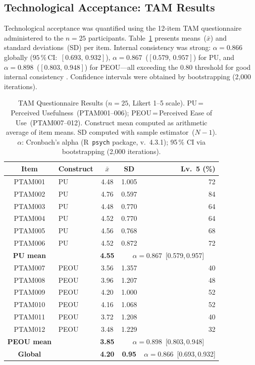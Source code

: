 \documentclass[journal]{IEEEtran}
\begin{document}
	\subsection{Technological Acceptance: TAM Results}
	Technological acceptance was quantified using the 12-item TAM
	questionnaire administered to the $n{=}25$ participants.
	Table~\ref{tab:tam} presents means~($\bar{x}$) and standard
	deviations~(SD) per item.
	Internal consistency was strong: $\alpha{=}0.866$ globally
	($95\,\%$\,CI:~$[0.693,\,0.932]$),
	$\alpha{=}0.867$~($[0.579,\,0.957]$) for PU, and
	$\alpha{=}0.898$~($[0.803,\,0.948]$) for PEOU---all exceeding
	the 0.80 threshold for good internal consistency
	\cite{nunnally1978}.
	Confidence intervals were obtained by bootstrapping
	(2{,}000 iterations).
	
	\begin{table}[!t]
		\caption{TAM Questionnaire Results ($n{=}25$, Likert 1--5 scale).
			PU\,=\,Perceived Usefulness~(PTAM001--006);
			PEOU\,=\,Perceived Ease of Use~(PTAM007--012).
			Construct mean computed as arithmetic average of item means.
			SD computed with sample estimator~($N-1$).
			$\alpha$: Cronbach's alpha (R~\texttt{psych} package, v.~4.3.1);
			95\,\% CI via bootstrapping (2{,}000 iterations).}
		\label{tab:tam}
		\centering
		\small
		\renewcommand{\arraystretch}{1.25}
		\begin{tabular}{clccr}
			\toprule
			\textbf{Item} & \textbf{Construct} & \textbf{$\bar{x}$} & \textbf{SD} & \textbf{Lv.~5 (\%)} \\
			\midrule
			PTAM001 & PU  & 4.48 & 1.005 & 72 \\
			PTAM002 & PU  & 4.76 & 0.597 & 84 \\
			PTAM003 & PU  & 4.48 & 0.770 & 64 \\
			PTAM004 & PU  & 4.52 & 0.770 & 64 \\
			PTAM005 & PU  & 4.56 & 0.768 & 68 \\
			PTAM006 & PU  & 4.52 & 0.872 & 72 \\
			\midrule
			\textbf{PU mean} & & \textbf{4.55} & \multicolumn{2}{c}{$\alpha{=}0.867$~[0.579,\,0.957]} \\
			\midrule
			PTAM007 & PEOU & 3.56 & 1.357 & 40 \\
			PTAM008 & PEOU & 3.96 & 1.207 & 48 \\
			PTAM009 & PEOU & 4.20 & 1.000 & 52 \\
			PTAM010 & PEOU & 4.16 & 1.068 & 52 \\
			PTAM011 & PEOU & 3.72 & 1.208 & 40 \\
			PTAM012 & PEOU & 3.48 & 1.229 & 32 \\
			\midrule
			\textbf{PEOU mean} & & \textbf{3.85} & \multicolumn{2}{c}{$\alpha{=}0.898$~[0.803,\,0.948]} \\
			\midrule
			\textbf{Global} & & \textbf{4.20} & \textbf{0.95} & $\alpha{=}0.866$~[0.693,\,0.932] \\
			\bottomrule
		\end{tabular}
	\end{table}
	
\end{document}
